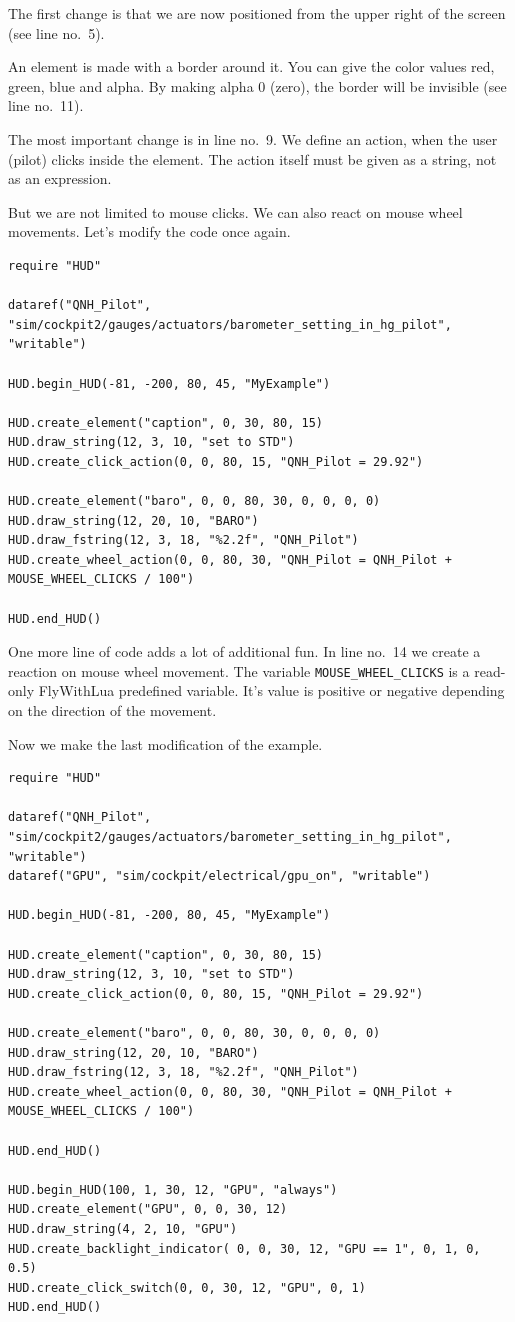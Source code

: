 \documentclass[11pt,parskip=half,a4paper]{scrartcl}
\begin{document}
The first change is that we are now positioned from the upper right of the screen (see line no.~5).

An element is made with a border around it. You can give the color values red, green, blue and alpha. By making alpha 0 (zero), the border will be invisible (see line no.~11).

The most important change is in line no.~9. We define an action, when the user (pilot) clicks inside the element. The action itself must be given as a string, not as an expression.

But we are not limited to mouse clicks. We can also react on mouse wheel movements. Let's modify the code once again.

\begin{lstlisting}[firstnumber=1]
require "HUD"

dataref("QNH_Pilot", "sim/cockpit2/gauges/actuators/barometer_setting_in_hg_pilot", "writable")

HUD.begin_HUD(-81, -200, 80, 45, "MyExample")

HUD.create_element("caption", 0, 30, 80, 15)
HUD.draw_string(12, 3, 10, "set to STD")
HUD.create_click_action(0, 0, 80, 15, "QNH_Pilot = 29.92")

HUD.create_element("baro", 0, 0, 80, 30, 0, 0, 0, 0)
HUD.draw_string(12, 20, 10, "BARO")
HUD.draw_fstring(12, 3, 18, "%2.2f", "QNH_Pilot")
HUD.create_wheel_action(0, 0, 80, 30, "QNH_Pilot = QNH_Pilot + MOUSE_WHEEL_CLICKS / 100")

HUD.end_HUD()
\end{lstlisting}

One more line of code adds a lot of additional fun. In line no.~14 we create a reaction on mouse wheel movement. The variable \verb|MOUSE_WHEEL_CLICKS| is a read-only FlyWithLua predefined variable. It's value is positive or negative depending on the direction of the movement.

Now we make the last modification of the example.

\begin{lstlisting}[firstnumber=1]
require "HUD"

dataref("QNH_Pilot", "sim/cockpit2/gauges/actuators/barometer_setting_in_hg_pilot", "writable")
dataref("GPU", "sim/cockpit/electrical/gpu_on", "writable")

HUD.begin_HUD(-81, -200, 80, 45, "MyExample")

HUD.create_element("caption", 0, 30, 80, 15)
HUD.draw_string(12, 3, 10, "set to STD")
HUD.create_click_action(0, 0, 80, 15, "QNH_Pilot = 29.92")

HUD.create_element("baro", 0, 0, 80, 30, 0, 0, 0, 0)
HUD.draw_string(12, 20, 10, "BARO")
HUD.draw_fstring(12, 3, 18, "%2.2f", "QNH_Pilot")
HUD.create_wheel_action(0, 0, 80, 30, "QNH_Pilot = QNH_Pilot + MOUSE_WHEEL_CLICKS / 100")

HUD.end_HUD()

HUD.begin_HUD(100, 1, 30, 12, "GPU", "always")
HUD.create_element("GPU", 0, 0, 30, 12)
HUD.draw_string(4, 2, 10, "GPU")
HUD.create_backlight_indicator( 0, 0, 30, 12, "GPU == 1", 0, 1, 0, 0.5)
HUD.create_click_switch(0, 0, 30, 12, "GPU", 0, 1)
HUD.end_HUD()
\end{lstlisting}
\end{document}
